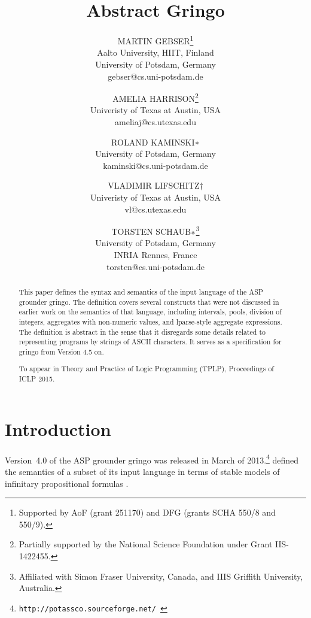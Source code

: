 \documentclass{tlp}
\title{\bf Abstract Gringo}
\author[Gebser et al.]
{MARTIN GEBSER\thanks{Supported by AoF (grant 
251170) and DFG (grants SCHA 550/8 and 550/9).}
\\
Aalto University, HIIT, Finland\\
University of Potsdam, Germany\\
gebser@cs.uni-potsdam.de\\
\and
AMELIA HARRISON\thanks{Partially supported
by the National Science Foundation under Grant IIS-1422455.} \\
Univeristy of Texas at Austin, USA\\
ameliaj@cs.utexas.edu\\
\and
ROLAND KAMINSKI$\ast$\\
University of Potsdam, Germany\\
kaminski@cs.uni-potsdam.de\\
\and
VLADIMIR LIFSCHITZ$\dagger$\\
Univeristy of Texas at Austin, USA\\
vl@cs.utexas.edu\\
\and
TORSTEN SCHAUB$\ast$\thanks{Affiliated with Simon Fraser 
University, Canada, and IIIS 
Griffith University, Australia.}\\
University of Potsdam, Germany\\
INRIA Rennes, France\\
torsten@cs.uni-potsdam.de\\
}
\begin{document}
\maketitle

\begin{abstract}
This paper defines the syntax and semantics of the input language of the
ASP grounder {\sc gringo}.  The definition covers several constructs
that were not discussed in earlier work on the semantics of that language,
including intervals, pools, 
division of integers, aggregates with non-numeric values,
and lparse-style aggregate expressions.  The definition is abstract in the
sense that it disregards some details related to representing programs by
strings of ASCII characters.
It serves as a specification for {\sc gringo} from Version 4.5 on.

To appear in Theory and Practice of Logic Programming (TPLP), Proceedings of 
ICLP 2015.
\end{abstract}

\section{Introduction}

Version~4.0 of the ASP grounder {\sc gringo} was released in March of
2013.\footnote{\tt http://potassco.sourceforge.net/ \label{ft1}}
\citeyear{har14a} defined the semantics of a subset of its input language
in terms of stable models of infinitary propositional formulas
\cite{tru12}.
\end{document}
